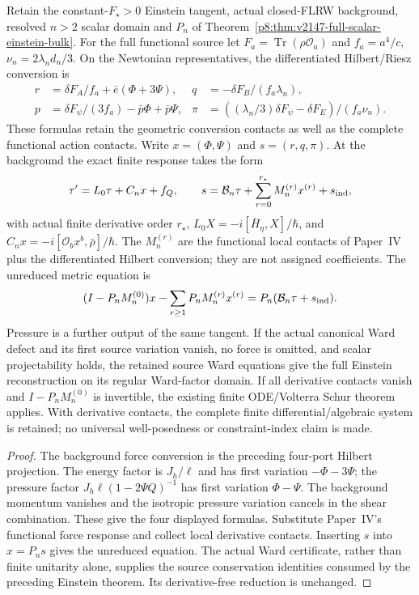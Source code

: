 \documentclass[12pt,a4paper]{article}
\begin{document}
\begin{corollary}
\label{p8:cor:v2149-functional-source-metric}
Retain the constant-$F_\star>0$ Einstein tangent, actual closed-FLRW
background, resolved $n>2$ scalar domain and $P_n$ of
Theorem~\ref{p8:thm:v2147-full-scalar-einstein-bulk}. For the full
functional source let $F_a=\operatorname{Tr}(\rho\mathcal O_a)$ and
$f_a=a^4/c$, $\nu_n=2\lambda_nd_n/3$. On the Newtonian representatives,
the differentiated Hilbert/Riesz conversion is
\begin{align*}
 r&=\delta F_A/f_a+\bar e(\Phi+3\Psi),&
 q&=-\delta F_B/(f_a\lambda_n),\\
 p&=\delta F_\psi/(3f_a)-\bar p\Phi+\bar p\Psi,&
 \pi&=((\lambda_n/3)\delta F_\psi-\delta F_E)/(f_a\nu_n).
\end{align*}
These formulas retain the geometric conversion contacts as well as the
complete functional action contacts. Write $x=(\Phi,\Psi)$ and
$s=(r,q,\pi)$. At the background the exact finite response takes the form
\[
 \tau'=L_0\tau+C_nx+f_Q,\qquad
 s=\mathcal B_n\tau+\sum_{r=0}^{r_\star}M_n^{(r)}x^{(r)}+s_{\rm ind},
\]
with actual finite derivative order $r_\star$, $L_0X=-i[\bar H_\eta,X]/\hbar$,
and $C_nx=-i[\mathcal O_bx^b,\bar\rho]/\hbar$.
The $M_n^{(r)}$ are the functional local contacts of Paper~IV plus the
differentiated Hilbert conversion; they are not assigned coefficients.
The unreduced metric equation is
\[
 (I-P_nM_n^{(0)})x-\sum_{r\ge1}P_nM_n^{(r)}x^{(r)}
                   =P_n(\mathcal B_n\tau+s_{\rm ind}).
\]
Pressure is a further output of the same tangent. If the actual canonical
Ward defect and its first source variation vanish, no force is omitted,
and scalar projectability holds, the retained source Ward equations give
the full Einstein reconstruction on its regular Ward-factor domain.
If all derivative contacts vanish and $I-P_nM_n^{(0)}$ is invertible,
the existing finite ODE/Volterra Schur theorem applies.
With derivative contacts, the complete finite differential/algebraic system
is retained; no universal well-posedness or constraint-index claim is made.
\end{corollary}
\begin{proof}
The background force conversion is the preceding four-port Hilbert
projection. The energy factor is $J_h/\ell$ and has first variation
$-\Phi-3\Psi$; the pressure factor
$J_h\ell(1-2\Psi Q)^{-1}$ has first variation $\Phi-\Psi$.
The background momentum vanishes and the isotropic pressure variation
cancels in the shear combination. These give the four displayed formulas.
Substitute Paper~IV's functional force response and collect local
derivative contacts. Inserting $s$ into $x=P_ns$ gives the unreduced
equation. The actual Ward certificate, rather than finite unitarity alone,
supplies the source conservation identities consumed by the preceding
Einstein theorem. Its derivative-free reduction is unchanged.
\end{proof}
\end{document}
